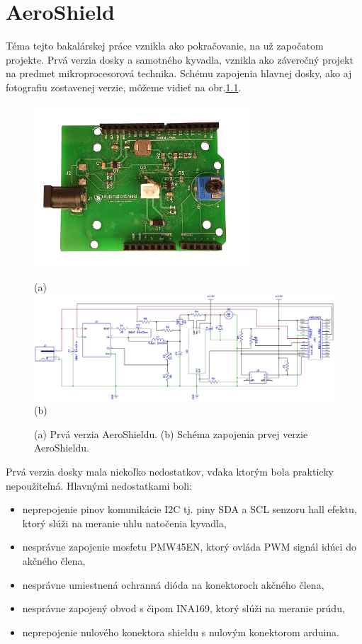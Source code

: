 \chapter{AeroShield}

Téma tejto bakalárskej práce vznikla ako pokračovanie, na už započatom projekte. Prvá verzia dosky a samotného kyvadla, vznikla ako záverečný projekt na predmet mikroprocesorová technika. Schému zapojenia hlavnej dosky, ako aj fotografiu zostavenej verzie, môžeme vidieť na obr.\ref{OBRAZOK 2.1.1}.


\begin{figure}[!tbh]
	\centering
	\includegraphics[width=80mm]{obr/oldshield.jpg}
	
	(a)
	\includegraphics[width=\linewidth]{obr/oldshieldscheme.png}
	(b)
	\caption{(a) Prvá verzia AeroShieldu. (b) Schéma zapojenia prvej verzie AeroShieldu.}
	\label{OBRAZOK 2.1.1}
\end{figure}

\vspace{3cm}

Prvá verzia dosky mala niekoľko nedostatkov, vďaka ktorým bola prakticky nepoužiteľná. Hlavnými nedostatkami boli:

\begin{itemize}
	\item neprepojenie pinov komunikácie I2C tj. piny SDA a SCL senzoru hall efektu, ktorý slúži na meranie uhlu natočenia kyvadla,
	\item nesprávne zapojenie mosfetu PMW45EN, ktorý ovláda PWM signál idúci do akčného člena,
	\item nesprávne umiestnená ochranná dióda na konektoroch akčného člena,
	\item nesprávne zapojený obvod s čipom INA169, ktorý slúži na meranie prúdu,
	\item neprepojenie nulového konektora shieldu s nulovým konektorom arduina.
\end{itemize}

